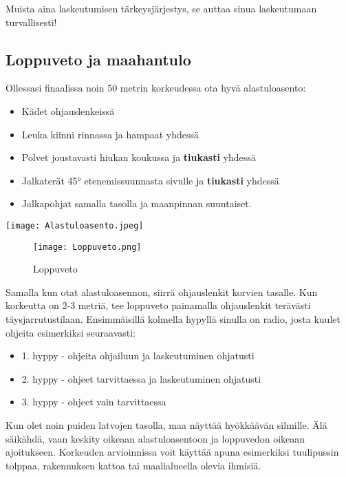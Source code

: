 \begin{multicols}{2}
Muista aina laskeutumisen tärkeysjärjestys, se auttaa sinua laskeutumaan turvallisesti! 

\subsection{ Loppuveto ja maahantulo  }
\label{hyppytapahtuma-loppuveto-ja-maahantulo}


Ollessasi finaalissa noin 50 metrin korkeudessa ota hyvä alastuloasento: 

\begin{itemize}
\item  Kädet ohjauslenkeissä 
\item  Leuka kiinni rinnassa ja hampaat yhdessä 
\item  Polvet joustavasti hiukan koukussa ja \textbf{tiukasti} yhdessä 
\item  Jalkaterät 45° etenemissuunnasta sivulle ja \textbf{tiukasti} yhdessä 
\item  Jalkapohjat samalla tasolla ja maanpinnan suuntaiset. 
\end{itemize}

\begin{Figure}\centering\texttt{[image: Alastuloasento.jpeg]}\end{Figure} \begin{figure*}[]\centering\texttt{[image: Loppuveto.png]}\caption{Loppuveto}\end{figure*} 


Samalla kun otat alastuloasennon, siirrä ohjauslenkit korvien tasalle. Kun korkeutta on 2-3 metriä, tee loppuveto painamalla ohjauslenkit terävästi täysjarrutustilaan. Ensimmäisillä kolmella hypyllä sinulla on radio, josta kuulet ohjeita esimerkiksi seuraavasti: 

\begin{itemize}
\item  1. hyppy - ohjeita ohjailuun ja laskeutuminen ohjatusti 
\item  2. hyppy - ohjeet tarvittaessa ja laskeutuminen ohjatusti 
\item  3. hyppy - ohjeet vain tarvittaessa 
\end{itemize}

Kun olet noin puiden latvojen tasolla, maa näyttää hyökkäävän silmille. Älä säikähdä, vaan keskity oikeaan alastuloasentoon ja loppuvedon oikeaan ajoitukseen. Korkeuden arvioinnissa voit käyttää apuna esimerkiksi tuulipussin tolppaa, rakennuksen kattoa tai maalialueella olevia ihmisiä.  



\end{multicols}
